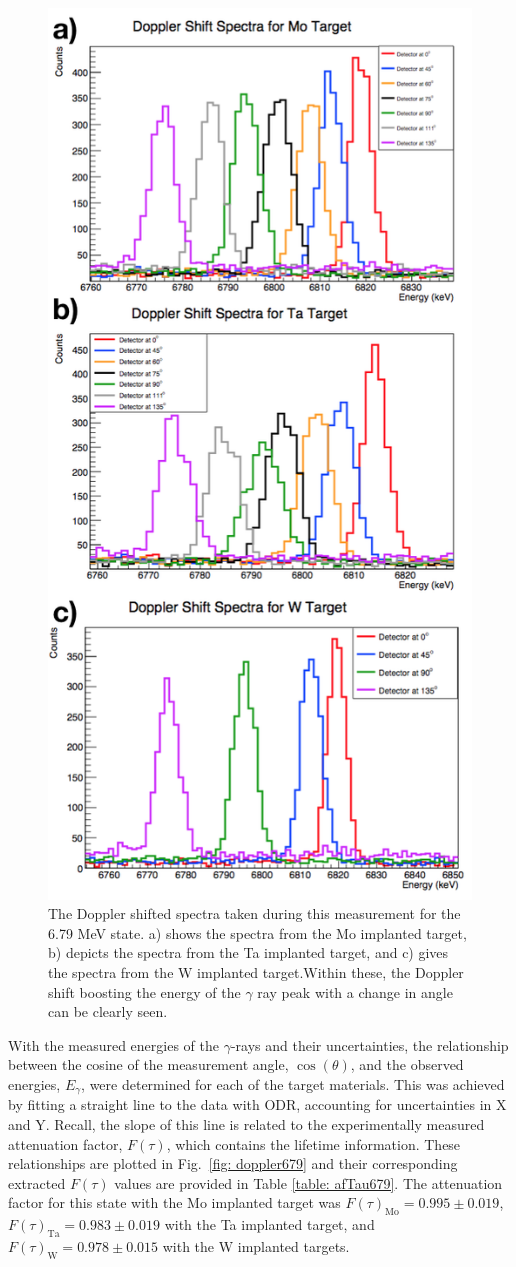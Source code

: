 \begin{figure}
\centering
\includegraphics[width=0.6\linewidth]{figures/shifts679.png}
\caption{The Doppler shifted spectra taken during this measurement for the 6.79 MeV state. a) shows the spectra from the Mo implanted target, b) depicts the spectra from the Ta implanted target, and c) gives the spectra from the W implanted target.Within these, the Doppler shift boosting the energy of the $\gamma$ ray peak  with a change in angle can be clearly seen. }
\label{fig: shift679}
\end{figure}


With the measured energies of the $\gamma$-rays and their uncertainties, the relationship between the cosine of the measurement angle, $\cos(\theta)$, and the observed energies, $E_{\gamma}$, were determined for each of the target materials. This was achieved by fitting a straight line to the data with ODR, accounting for uncertainties in X and Y. Recall, the slope of this line is related to the experimentally measured attenuation factor, $F(\tau)$, which contains the lifetime information. These relationships are plotted in Fig.\ \ref{fig: doppler679} and their corresponding extracted $F(\tau)$ values are provided in Table \ref{table: afTau679}. The attenuation factor for this state with the Mo implanted target was $F(\tau)_{\text{Mo}} =0.995 \pm 0.019$, $F(\tau)_{\text{Ta}} = 0.983 \pm 0.019$ with the Ta implanted target, and $F(\tau)_{\text{W}} = 0.978 \pm 0.015$ with the W implanted targets.



